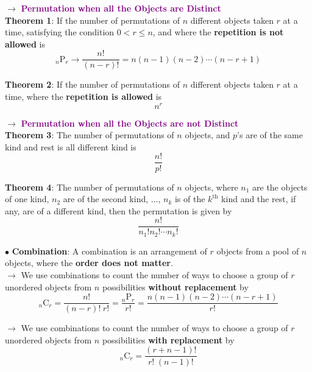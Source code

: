 \documentclass[letterpaper, 10.5pt,landscape]{article}
\begin{document}
\begin{multicols*}{3}
\vspace{3pt}
$\rightarrow$ \textcolor{purple}{\textbf{Permutation when all the Objects are Distinct}} \\
\textbf{Theorem 1}: If the number of permutations of $n$ different objects taken $r$ at a time, satisfying the condition \(\boxed{0 < r \leq n} \), and where the \textbf{repetition is not allowed} is 
\vspace{-5pt}
\[\boxed{{}_n \mathrm{ P }_r \rightarrow \frac{n!}{(n-r)!} = n(n-1)(n-2) \cdots (n-r+1)} \]



\textbf{Theorem 2}: If the number of permutations of $n$ different objects taken $r$ at a time, where the \textbf{repetition is allowed }is
\vspace{-5pt}
\[\boxed{n^{r}} \]


\vspace{3pt}
$\rightarrow$  \textcolor{purple}{\textbf{Permutation when all the Objects are not Distinct}} \\
\textbf{Theorem 3}: The number of permutations of $n$ objects, and $p$'s are of the same kind and rest is all different kind is 
\vspace{-3pt}
\[\boxed{\frac{n!}{p!}}\]



\textbf{Theorem 4}: The number of permutations of $n$ objects, where $n_{1}$ are the objects of one kind, $n_{2}$ are of the second kind, ..., $n_{k}$ is of the $k^{\text{th}}$ kind and the rest, if any, are of a different kind, then the permutation is given by 
\vspace{-3pt}
\[\boxed{\frac{n!}{n_{1}! n_{2}! \cdots n_{k}!}} \]

\vspace{5pt}
$\bullet$ \textbf{Combination}:  A combination is an arrangement of $r$ objects from a pool of $n$ objects, where the \textbf{order does not matter}.\\
$\rightarrow$ We use combinations to count the number of ways to choose a group of $r$ unordered objects from $n$ possibilities \textbf{without replacement} by 
\vspace{-3pt}
\[\boxed{{}_n \mathrm{ C }_r = \frac{n!}{(n-r)! \hspace{3pt} r!} = \frac{{}_n \mathrm{ P }_r}{r!} = \frac{n(n-1)(n-2) \cdots (n-r+1)}{r!}} \]




$\rightarrow$ We use combinations to count the number of ways to choose a group of $r$ unordered objects from $n$ possibilities \textbf{with replacement} by
\vspace{-3pt}
\[\boxed{{}_n \mathrm{ C }_r = \frac{(r+n-1)!}{r! \hspace{3pt} (n-1)!}}\]




\end{multicols*}
\end{document}
